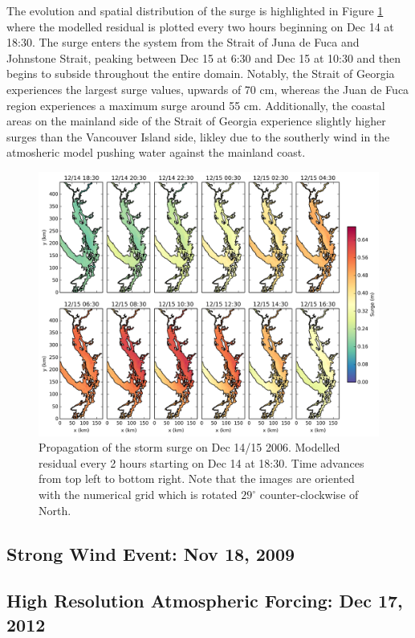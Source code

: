 \documentclass[pdftex,10pt]{article}
\begin{document}
The evolution and spatial distribution of the surge is highlighted in Figure \ref{fig:spatial} where the modelled residual is plotted every two hours beginning on Dec 14 at 18:30. The surge enters the system from the Strait of Juna de Fuca and Johnstone Strait, peaking between Dec 15 at 6:30 and Dec 15 at 10:30 and then begins to subside throughout the entire domain. Notably, the Strait of Georgia experiences the largest surge values, upwards of 70 cm, whereas the Juan de Fuca region experiences a maximum surge around 55 cm. Additionally, the coastal areas on the mainland side of the Strait of Georgia experience slightly higher surges than the Vancouver Island side, likley due to the southerly wind in the atmosheric model pushing water against the mainland coast.  

\begin{figure}
\centering
\includegraphics[scale=0.6]{Figures/dec2006_spatial.pdf}
\caption{Propagation of the storm surge on Dec 14/15 2006. Modelled residual every 2 hours starting on Dec 14 at 18:30. Time advances from top left to bottom right. Note that the images are oriented with the numerical grid which is rotated $29^{\circ}$ counter-clockwise of North. }
\label{fig:spatial}
\end{figure}

\subsection{Strong Wind Event: Nov 18, 2009}

\subsection{High Resolution Atmospheric Forcing: Dec 17, 2012}
\end{document}
